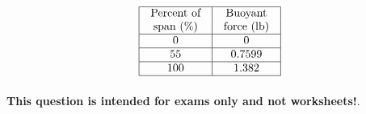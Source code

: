 $$\vbox{\offinterlineskip
\halign{\strut
\vrule \quad\hfil # \ \hfil & 
\vrule \quad\hfil # \ \hfil \vrule \cr
\noalign{\hrule}
%
Percent of & Buoyant  \cr
%
span (\%) & force (lb) \cr
%
\noalign{\hrule}
%
0 & 0 \cr
%
\noalign{\hrule}
%
55 & 0.7599 \cr
%
\noalign{\hrule}
%
100 & 1.382 \cr
%
\noalign{\hrule}
} %
}$$ %








{\bf This question is intended for exams only and not worksheets!}.



